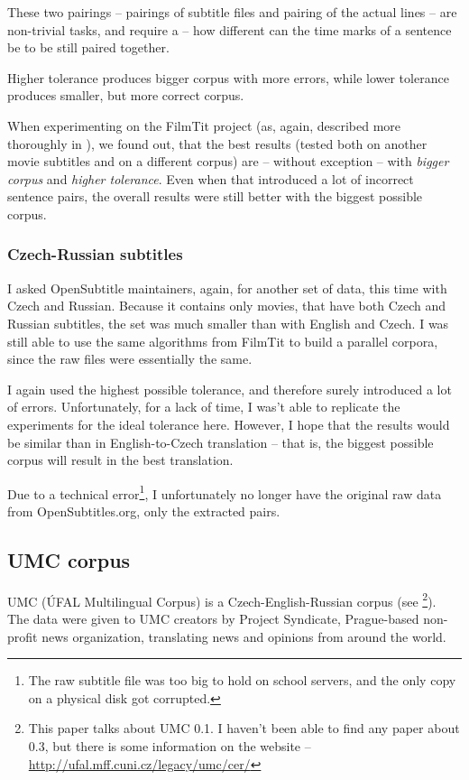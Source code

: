 These two pairings -- pairings of subtitle files and pairing of the actual lines -- are non-trivial tasks, and require a  -- how different can the time marks of a sentence be to be still paired together.

Higher tolerance produces bigger corpus with more errors, while lower tolerance produces smaller, but more correct corpus.

When experimenting on the FilmTit project (as, again, described more thoroughly in \cite{filmtit}), we found out, that the best results (tested both on another movie subtitles and on a different corpus) are -- without exception -- with \emph{bigger corpus} and \emph{higher tolerance}. Even when that introduced a lot of incorrect sentence pairs, the overall results were still better with the biggest possible corpus.
\subsubsection{Czech-Russian subtitles}

I asked OpenSubtitle maintainers, again, for another set of data, this time with Czech and Russian.
Because it contains only movies, that have both Czech and Russian subtitles, the set was much smaller than with English and Czech. I was still able to use the same algorithms from FilmTit to build a parallel corpora, since the raw files were essentially the same.

I again used the highest possible tolerance, and therefore surely introduced a lot of errors. Unfortunately, for a lack of time, I was't able to replicate the experiments for the ideal tolerance here. However, I hope that the results would be similar than in English-to-Czech translation -- that is, the biggest possible corpus will result in the best translation.

Due to a technical error\footnote{The raw subtitle file was too big to hold on school servers, and the only copy on a physical disk got corrupted.}, I unfortunately no longer have the original raw data from OpenSubtitles.org, only the extracted pairs. 


\subsection{UMC corpus}
UMC (ÚFAL Multilingual Corpus) is a Czech-English-Russian corpus (see \cite{umc}\footnote{This paper talks about UMC 0.1. I haven't been able to find any paper about 0.3, but there is some information on the website -- \url{http://ufal.mff.cuni.cz/legacy/umc/cer/}}). The data were given to UMC creators by Project Syndicate, Prague-based non-profit news organization, translating news and opinions from around the world.

